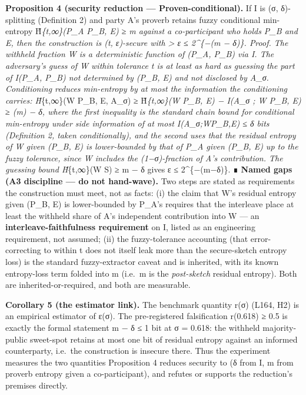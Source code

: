 \documentclass[
  11pt,
]{article}
\begin{document}
\textbf{Proposition 4 (security reduction --- Proven-conditional).} If I
is (σ, δ)-splitting (Definition 2) and party A's proverb retains fuzzy
conditional min-entropy H̃\emph{\{t,∞\}(P\_A \textbar{} P\_B, E) ≥ m
against a co-participant who holds P\_B and E, then the construction is
(t, ε)-secure with \textgreater{} ε ≤ 2\^{}\{−(m − δ)\}. \emph{Proof.}
The withheld fraction W is a deterministic function of (P\_A, P\_B) via
I. The adversary's guess of W within tolerance t is at least as hard as
guessing the part of I(P\_A, P\_B) not determined by (P\_B, E) and not
disclosed by A\_σ. Conditioning reduces min-entropy by at most the
information the conditioning carries: H̃}\{t,∞\}(W \textbar{} P\_B, E,
A\_σ) ≥ H̃\emph{\{t,∞\}(W \textbar{} P\_B, E) − I(A\_σ ; W \textbar{}
P\_B, E) ≥ (m) − δ, where the first inequality is the standard chain
bound for conditional min-entropy under side information of at most
I(A\_σ;W\textbar P\_B,E) ≤ δ bits (Definition 2, taken conditionally),
and the second uses that the residual entropy of W given (P\_B, E) is
lower-bounded by that of P\_A given (P\_B, E) up to the fuzzy tolerance,
since W includes the (1−σ)-fraction of A's contribution. The guessing
bound H̃}\{t,∞\}(W \textbar{} S) ≥ m − δ gives ε ≤ 2\^{}\{−(m−δ)\}. ∎
\textbf{Named gaps (A3 discipline --- do not hand-wave).} Two steps are
stated as requirements the construction must meet, not as facts: (i) the
claim that W's residual entropy given (P\_B, E) is lower-bounded by
P\_A's requires that the interleave place at least the withheld share of
A's independent contribution into W --- an
\textbf{interleave-faithfulness requirement} on I, listed as an
engineering requirement, not assumed; (ii) the fuzzy-tolerance
accounting (that error-correcting to within t does not itself leak more
than the secure-sketch entropy loss) is the standard fuzzy-extractor
caveat and is inherited, with its known entropy-loss term folded into m
(i.e.~m is the \emph{post-sketch} residual entropy). Both are
inherited-or-required, and both are measurable.

\textbf{Corollary 5 (the estimator link).} The benchmark quantity r(σ)
(L164, H2) is an empirical estimator of ε(σ). The pre-registered
falsification r(0.618) ≥ 0.5 is exactly the formal statement m − δ ≤ 1
bit at σ = 0.618: the withheld majority-public sweet-spot retains at
most one bit of residual entropy against an informed counterparty,
i.e.~the construction is insecure there. Thus the experiment measures
the two quantities Proposition 4 reduces security to (δ from I, m from
proverb entropy given a co-participant), and refutes or supports the
reduction's premises directly.
\end{document}
